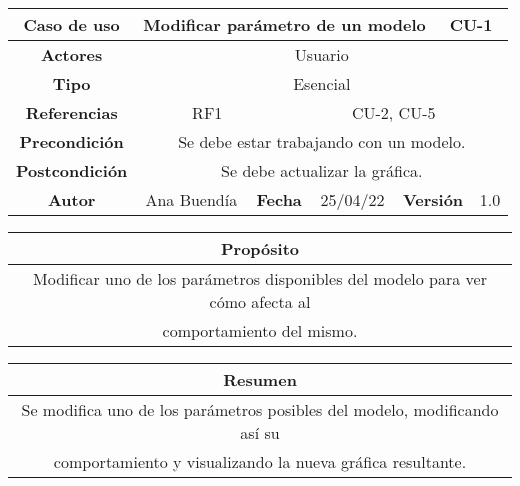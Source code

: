 \begin{table}[!h]
\begin{tabular}{|c|c|c|c|c|c|c|c|}
\hline
\rowcolor{cyan} \textbf{Caso de uso} & \multicolumn{5}{|c|}{Modificar parámetro de un modelo} & \multicolumn{2}{|c|}{CU-1} \\
\hline
\cellcolor{cyan} \textbf{Actores}              & \multicolumn{7}{|c|}{Usuario}           \\
\hline
\cellcolor{cyan} \textbf{Tipo}                 & \multicolumn{7}{|c|}{Esencial}             \\
\hline
\cellcolor{cyan} \textbf{Referencias}          & \multicolumn{2}{|c|}{RF1}           & \multicolumn{5}{|c|}{CU-2, CU-5}\\
\hline
\cellcolor{cyan} \textbf{Precondición}         & \multicolumn{7}{|c|}{Se debe estar trabajando con un modelo.}             \\
\hline
\cellcolor{cyan} \textbf{Postcondición}        & \multicolumn{7}{|c|}{Se debe actualizar la gráfica.}              \\
\hline
\cellcolor{cyan} \textbf{Autor}                &   Ana Buendía  & \multicolumn{2}{|c|}{\cellcolor{cyan} \textbf{Fecha}} &  25/04/22   & \multicolumn{2}{|c|}{\cellcolor{cyan} \textbf{Versión}} & 1.0  \\
\hline
\end{tabular}
\end{table}

\begin{table}[!h]
\begin{tabular}{|c|}
\hline
\cellcolor{cyan} \textbf{Propósito} \\
\hline
Modificar uno de los parámetros disponibles del modelo para ver cómo afecta al \\ comportamiento del mismo.   \\
\hline
\end{tabular}
\end{table}

\begin{table}[!h]
\begin{tabular}{|c|}
\hline
\cellcolor{cyan} \textbf{Resumen}  \\
\hline
Se modifica uno de los parámetros posibles del modelo, modificando así su \\ comportamiento y visualizando la nueva gráfica resultante.   \\
\hline
\end{tabular}
\end{table}

